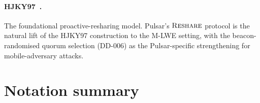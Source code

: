 \documentclass[11pt,a4paper]{article}
\theoremstyle{definition}
\theoremstyle{remark}
\newcommand{\Reshare}{\textsc{Reshare}}
\begin{document}
\paragraph{HJKY97~\cite{hjky97}.}
The foundational proactive-resharing model. Pulsar's $\Reshare$
protocol is the natural lift of the HJKY97 construction to the M-LWE
setting, with the beacon-randomised quorum selection (DD-006) as the
Pulsar-specific strengthening for mobile-adversary attacks.

\appendix
\section{Notation summary}
\label{sec:notation-table}
\end{document}
